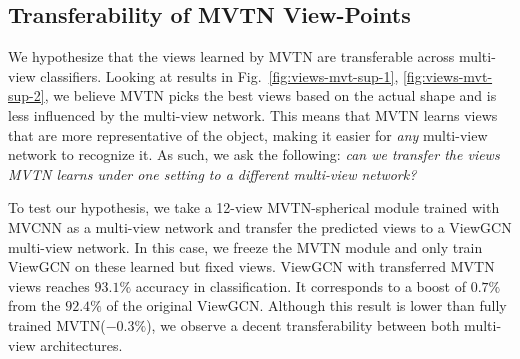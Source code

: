 \documentclass[10pt,twocolumn,letterpaper]{article}
\newcommand{\figLabel}{Fig.~}
\begin{document}
\subsection{Transferability of MVTN View-Points}
We hypothesize that the views learned by MVTN are transferable across multi-view classifiers. Looking at results in \figLabel{\ref{fig:views-mvt-sup-1}, \ref{fig:views-mvt-sup-2}}, we believe MVTN picks the best views based on the actual shape and is less influenced by the multi-view network.
This means that MVTN learns views that are more representative of the object, making it easier for \textit{any} multi-view network to recognize it.
As such, we ask the following:
\textit{can we transfer the views MVTN learns under one setting to a different multi-view network?}

To test our hypothesis, we take a 12-view MVTN-spherical module trained with MVCNN as a multi-view network and transfer the predicted views to a ViewGCN multi-view network. In this case, we freeze the MVTN module and only train ViewGCN on these learned but fixed views. ViewGCN with transferred MVTN views reaches $93.1\%$ accuracy in classification. It corresponds to a boost of $0.7\%$ from the $92.4\%$ of the original ViewGCN. Although this result is lower than fully trained MVTN($-0.3\%$), we observe a decent transferability between both multi-view architectures.
\end{document}
